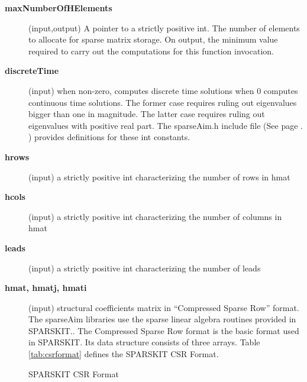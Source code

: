 \documentclass{article}
\begin{document}
\begin{description}
\item[{\bf maxNumberOfHElements}] (input,output) A pointer to a 
strictly positive int.
The number of elements to allocate
for sparse matrix storage. On output, the minimum value required to carry
out the computations for this function invocation.
\item[{\bf discreteTime}] (input) when non-zero, computes discrete time solutions
when 0 computes continuous time solutions.
The former case requires ruling out eigenvalues bigger than one in magnitude.
The latter case requires ruling out eigenvalues with positive real part. The
sparseAim.h include file (See page \pageref{includeFile}. )
provides definitions for these int constants.
\item[{\bf hrows}] (input) a strictly positive int characterizing the
number of rows in hmat
\item[{\bf hcols}] (input) a strictly positive int characterizing the
number of columns in hmat
\item[{\bf leads}] (input) a strictly positive int characterizing the
number of leads
\item[{\bf hmat, hmatj, hmati}] (input) structural coefficients matrix in ``Compressed Sparse Row'' format. 
The sparseAim libraries
use the sparse linear algebra routines provided in
SPARSKIT.\cite{saad94}.
The Compressed Sparse Row format is the basic
format used in SPARSKIT. Its  data structure consists of three arrays.
Table \ref{tab:csrformat} defines the SPARSKIT CSR Format.


\begin{table}[htbp]
  \begin{center}
    \caption{SPARSKIT CSR Format}
    \label{tab:csrformat}
  \end{center}
\end{table}


\end{description}
\end{document}
